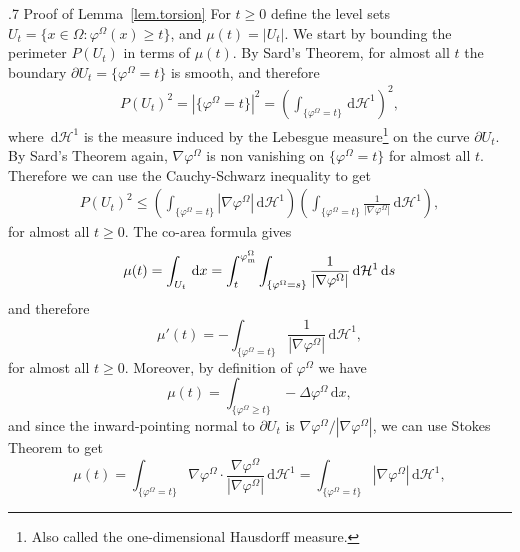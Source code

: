 \documentclass[11pt,a4paper]{amsart}
\makeatletter
\def\section{\@startsection{section}{1}\z@{.9\linespacing\@plus\linespacing}%
	{.7\linespacing} {\fontsize{13}{14}\selectfont\bfseries\centering}}
\def\dd{{\,\mathrm{d}}}
\numberwithin{figure}{section}
\numberwithin{equation}{section}
\theoremstyle{plain}%
\theoremstyle{remark}
\theoremstyle{plain}
\newcommand\cH{\mathcal H}
\makeatother
\begin{document}
\begin{appendix}
	\section{Proof of Lemma~\ref{lem.torsion}}
		For $t \geq 0$ define the level sets $U_t = \lbrace x \in \Omega\colon \varphi^\Omega(x) \geq t \rbrace$, and $\mu(t) = | U_t |$. We start by bounding the perimeter $P(U_t)$ in terms of $\mu(t)$. By Sard's Theorem, for almost all $t$ the boundary $\partial U_t = \lbrace \varphi^\Omega = t \rbrace$ is smooth, and therefore
		\begin{align*}
		P(U_t)^2 = | \lbrace \varphi^\Omega = t \rbrace |^2 = \left( \int_{\lbrace \varphi^\Omega = t \rbrace} \dd \mathcal H^1 \right)^2,
		\end{align*}
		where $\dd \mathcal H^1$ is the measure induced by the Lebesgue measure\footnote{Also called the one-dimensional Hausdorff measure.} on the curve $\partial U_t$.
		By Sard's Theorem again, $\nabla \varphi^\Omega$ is non vanishing on $\lbrace \varphi^\Omega = t \rbrace$ for almost all $t$. Therefore we can use the Cauchy-Schwarz inequality to get
		\begin{align}\label{eq.P2}
		P(U_t)^2 \leq  \left(\int_{\lbrace \varphi^\Omega = t \rbrace} | \nabla \varphi^\Omega |\dd\cH^1\right)\left( \int_{\lbrace \varphi^\Omega = t \rbrace} \frac{1}{|\nabla \varphi^\Omega|}\dd\cH^1\right),
		\end{align}
		for almost all $t\geq 0$. The co-area formula gives
		\[ \mu(t) = \int_{U_t} \dd x = \int_t^{\varphi_{\rm m}^\Omega} \int_{\lbrace \varphi^\Omega = s \rbrace} \frac{1}{|\nabla \varphi^\Omega|}\dd\cH^1 \dd s\]
		and therefore
		\begin{equation}\label{eq.mu'}
		\mu'(t) = -\int_{\lbrace \varphi^\Omega = t \rbrace} \frac{1}{|\nabla \varphi^\Omega|}\dd\cH^1,
		 \end{equation}
		 for almost all $t\geq 0$.
		Moreover, by definition of $\varphi^\Omega$ we have
		\[ \mu(t) = \int_{\lbrace \varphi^\Omega \geq t \rbrace} - \Delta \varphi^\Omega \dd x,\]
		and since the inward-pointing normal to $\partial U_t$ is $\nabla \varphi^\Omega / | \nabla \varphi^\Omega |$, we can use Stokes Theorem to get
		\begin{equation}\label{eq.mu}
		\mu(t) = \int_{\lbrace \varphi^\Omega = t \rbrace} \nabla \varphi^\Omega \cdot \frac{\nabla \varphi^\Omega}{|\nabla \varphi^\Omega|} \dd \mathcal H^1 = \int_{\lbrace \varphi^\Omega = t \rbrace} |\nabla \varphi^\Omega | \dd \mathcal H^1,
		\end{equation}

\end{appendix}
\end{document}

